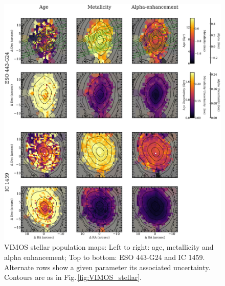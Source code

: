 		\begin{figure}
			\centering
			\includegraphics[height=0.63\textheight]{chapter4/vimos/pop1.png}
			\caption[VIMOS stellar population maps]{VIMOS stellar population maps: Left to right: age, metallicity and alpha enhancement; Top to bottom: ESO 443-G24 and IC 1459. Alternate rows show a given parameter its associated uncertainty. Contours are as in Fig.\,\ref{fig:VIMOS_stellar}.}%
			\label{fig:VIMOS_pop}
		\end{figure}

